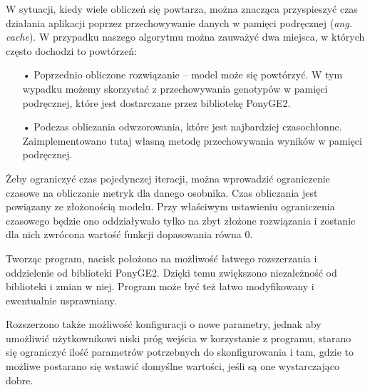 W sytuacji, kiedy wiele obliczeń się powtarza, można znacząca przyspieszyć czas działania aplikacji poprzez przechowywanie danych w pamięci podręcznej (\textit{ang. cache}). W przypadku naszego algorytmu można zauważyć dwa miejsca, w których często dochodzi to powtórzeń:
\begin{itemize}
  \item[•] Poprzednio obliczone rozwiązanie -- model może się powtórzyć. W tym wypadku możemy skorzystać z przechowywania genotypów w pamięci podręcznej, które jest dostarczane przez bibliotekę PonyGE2.
  \item[•] Podczas obliczania odwzorowania, które jest najbardziej czasochłonne. Zaimplementowano tutaj własną metodę przechowywania wyników w pamięci podręcznej.
\end{itemize}

Żeby ograniczyć czas pojedynczej iteracji, można wprowadzić ograniczenie czasowe na obliczanie metryk dla danego osobnika. Czas obliczania jest powiązany ze złożonością modelu. Przy właściwym ustawieniu ograniczenia czasowego będzie ono oddziaływało tylko na zbyt złożone rozwiązania i zostanie dla nich zwrócona wartość funkcji dopasowania równa 0.

Tworząc program, nacisk położono na możliwość łatwego rozszerzania i oddzielenie od biblioteki PonyGE2. Dzięki temu zwiększono niezależność od biblioteki i zmian w niej. Program może być też łatwo modyfikowany i ewentualnie usprawniany. 

Rozszerzono także możliwość konfiguracji o nowe parametry, jednak aby umożliwić użytkownikowi niski próg wejścia w korzystanie z programu, starano się ograniczyć ilość parametrów potrzebnych do skonfigurowania i tam, gdzie to możliwe postarano się wstawić domyślne wartości, jeśli są one wystarczająco dobre. 

